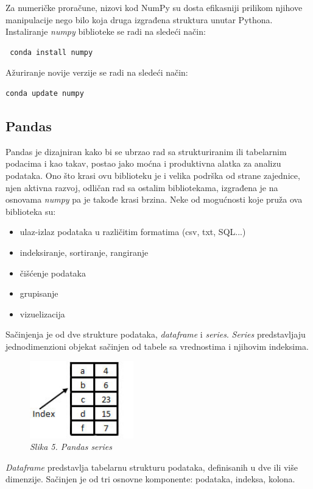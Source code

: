 \documentclass[12pt]{article}
\begin{document}
Za numeričke proračune, nizovi kod NumPy su dosta efikasniji prilikom njihove manipulacije nego bilo koja druga izgrađena struktura unutar Pythona. Instaliranje \textsl{numpy} biblioteke se radi na sledeći način:
\begin{lstlisting}
 conda install numpy
\end{lstlisting}
 Ažuriranje novije verzije se radi na sledeći način:
\begin{lstlisting}[language=Python]
 conda update numpy
\end{lstlisting}
\subsection{Pandas}
Pandas je dizajniran kako bi se ubrzao rad sa strukturiranim ili tabelarnim podacima i kao takav, postao jako moćna i produktivna alatka za analizu podataka. Ono što krasi ovu biblioteku je i velika podrška od strane zajednice, njen aktivna razvoj, odličan rad sa ostalim bibliotekama, izgrađena je na osnovama \textsl{numpy} pa je takođe krasi brzina. Neke od mogućnosti koje pruža ova biblioteka su:
\begin{itemize}
  \item ulaz-izlaz podataka u različitim formatima (csv, txt, SQL...)
  \item indeksiranje, sortiranje, rangiranje
  \item čišćenje podataka 
  \item grupisanje
  \item vizuelizacija
\end{itemize}
Sačinjenja je od dve strukture podataka, \textsl{dataframe} i \textsl{series}.  \textsl{Series} predstavljaju jednodimenzioni objekat sačinjen od tabele sa vrednostima i njihovim indeksima. 
\begin{figure}[h!]
\centering
\includegraphics[width=0.4\textwidth]{pandas-series.jpg}
\caption*{\textsl{Slika 5. Pandas series }}
\end{figure}
\textsl{Dataframe} predstavlja tabelarnu strukturu podataka, definisanih u dve ili više dimenzije.  Sačinjen je od tri osnovne komponente: podataka, indeksa, kolona. 
\end{document}
